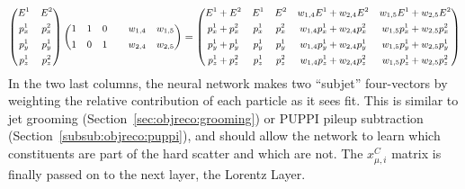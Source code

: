 \begin{equation*}
  \footnotesize
  \begin{centering}
  \begin{pmatrix}
    E^1 & E^2\\[1ex]
    p_x^1 & p_x^2\\[1ex]
    p_y^1 & p_y^1\\[1ex]
    p_z^1 & p_z^2
  \end{pmatrix}
  \begin{pmatrix}
    1 & 1 & 0 & & w_{1,4} & w_{1,5}\\[1ex]
    1 & 0 & 1 & & w_{2,4} & w_{2,5}\\
  \end{pmatrix}
  = \begin{pmatrix}
    E^1  +E^2   & E^1   & E^2   & w_{1,4}E^1   + w_{2,4}E^2   & w_{1,5}E^1  +w_{2,5}E^2    \\[1ex]
    p_x^1+p_x^2 & p_x^1 & p_x^2 & w_{1,4}p_x^1 + w_{2,4}p_x^2 & w_{1,5}p_x^1+w_{2,5}p_x^2  \\[1ex]
    p_y^1+p_y^1 & p_y^1 & p_y^1 & w_{1,4}p_y^1 + w_{2,4}p_y^1 & w_{1,5}p_y^1+w_{2,5}p_y^1  \\[1ex]
    p_z^1+p_z^2 & p_z^1 & p_z^2 & w_{1,4}p_z^1 + w_{2,4}p_z^2 & w_{1,5}p_z^1+w_{2,5}p_z^2
  \end{pmatrix}
   \end{centering}
\end{equation*}
 In the two last columns, the neural network makes two ``subjet'' four-vectors by weighting the relative contribution of each particle as it sees fit. This is similar to jet grooming (Section~\ref{sec:objreco:grooming}) or PUPPI pileup subtraction (Section~\ref{subsub:objreco:puppi}), and should allow the network to learn which constituents are part of the hard scatter and which are not. The $x_{\mu,i}^{C}$ matrix is finally passed on to the next layer, the Lorentz Layer.
